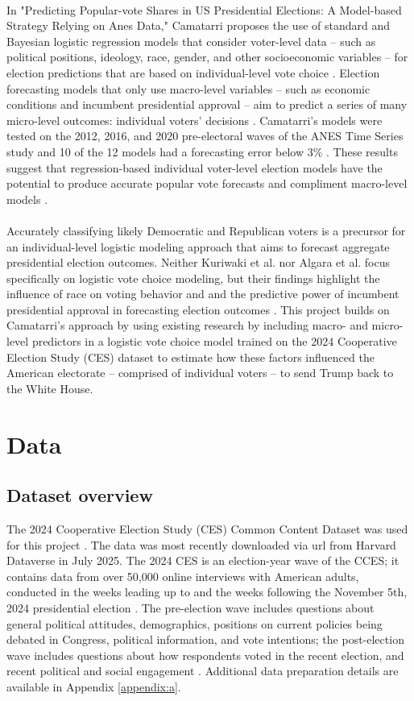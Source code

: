 \documentclass[letter]{article}
\begin{document}
\\
In "Predicting Popular-vote Shares in US Presidential Elections: A Model-based Strategy Relying on Anes Data," Camatarri proposes the use of standard and Bayesian logistic regression models that consider voter-level data – such as political positions, ideology, race, gender, and other socioeconomic variables – for election predictions that are based on individual-level vote choice \cite{mongrain} \cite{camatarri}. Election forecasting models that only use macro-level variables – such as economic conditions and incumbent presidential approval – aim to predict a series of many micro-level outcomes: individual voters' decisions \cite{camatarri}. Camatarri's models were tested on the 2012, 2016, and 2020 pre-electoral waves of the ANES Time Series study and 10 of the 12 models had a forecasting error below 3\% \cite{camatarri}. These results suggest that regression-based individual voter-level election models have the potential to produce accurate popular vote forecasts and compliment macro-level models \cite{camatarri}. \\
\\
Accurately classifying likely Democratic and Republican voters is a precursor for an individual-level logistic modeling approach that aims to forecast aggregate presidential election outcomes. Neither Kuriwaki et al. nor Algara et al. focus specifically on logistic vote choice modeling, but their findings highlight the influence of race on voting behavior and and the predictive power of incumbent presidential approval in forecasting election outcomes \cite{kuriwaki} \cite{algara}.
This project builds on Camatarri's approach by using existing research by including macro- and micro-level predictors in a logistic vote choice model trained on the 2024 Cooperative Election Study (CES) dataset to estimate how these factors influenced the American electorate – comprised of individual voters – to send Trump back to the White House.
\section{Data} \label{sec:data}
\subsection{Dataset overview}
The 2024 Cooperative Election Study (CES) Common Content Dataset was used for this project \cite{ces24}. The data was most recently downloaded via url from Harvard Dataverse in July 2025. The 2024 CES is an election-year wave of the CCES; it contains data from over 50,000 online interviews with American adults, conducted in the weeks leading up to and the weeks following the November 5th, 2024 presidential election \cite{ceswebsite}. The pre-election wave includes questions about general political attitudes, demographics, positions on current policies being debated in Congress, political information, and vote intentions; the post-election wave includes questions about how respondents voted in the recent election, and recent political and social engagement \cite{ces24} \cite{ceswebsite}.  Additional data preparation details are available in Appendix \ref{appendix:a}.
\end{document}
